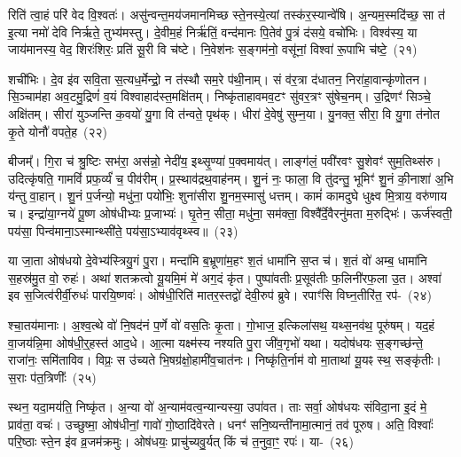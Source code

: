 रिति॑ त्वा॒हं परि॑ वेद वि॒श्वतः॑। असु॑न्वन्त॒मय॑जमानमिच्छ स्ते॒नस्ये॒त्यां तस्क॑र॒स्यान्वे॑षि। अ॒न्यम॒स्मदि॑च्छ॒ सा त॑ इ॒त्या नमो॑ देवि निर्\mbox{}ऋते॒ तुभ्य॑मस्तु। दे॒वीम॒हं निर्\mbox{}ऋ॑तिं॒ वन्द॑मानः पि॒तेव॑ पु॒त्रं द॑सये॒ वचो॑भिः। विश्व॑स्य॒ या जाय॑मानस्य॒ वेद॒ शिरः॑शिरः॒ प्रति॑ सू॒री वि च॑ष्टे। नि॒वेश॑नः स॒ङ्गम॑नो॒ वसू॑नां॒ विश्वा॑ रू॒पाभि च॑ष्टे॒~(२१)\ip

शची॑भिः। दे॒व इ॑व सवि॒ता स॒त्यध॒र्मेन्द्रो॒ न त॑स्थौ सम॒रे प॑थी॒नाम्। सं व॑र॒त्रा द॑धातन॒ निरा॑हा॒वान्कृ॑णोतन। सि॒ञ्चाम॑हा अव॒टमु॒द्रिणं॑ व॒यं विश्वाहाद॑स्त॒मक्षि॑तम्। निष्कृ॑ताहावमव॒टꣳ सु॑वर॒त्रꣳ सु॑षेच॒नम्। उ॒द्रिणꣳ॑ सिञ्चे॒ अक्षि॑तम्। सीरा॑ युञ्जन्ति क॒वयो॑ यु॒गा वि त॑न्वते॒ पृथ॑क्। धीरा॑ दे॒वेषु॑ सुम्न॒या। यु॒नक्त॒ सीरा॒ वि यु॒गा त॑नोत कृ॒ते योनौ॑ वपते॒ह~(२२)\ip

बीजम्᳚। गि॒रा च॑ श्रु॒ष्टिः सभ॑रा॒ अस॑न्नो॒ नेदी॑य॒ इथ्सृ॒ण्या॑ प॒क्वमाय॑त्। लाङ्ग॑लं॒ पवी॑रवꣳ सु॒शेवꣳ॑ सुम॒तिथ्स॑रु। उदित्कृ॑षति॒ गामविं॑ प्रफ॒र्व्यं॑ च॒ पीव॑रीम्। प्र॒स्थाव॑द्रथ॒वाह॑नम्। शु॒नं नः॒ फाला॒ वि तु॑दन्तु॒ भूमिꣳ॑ शु॒नं की॒नाशा॑ अ॒भि य॑न्तु वा॒हान्। शु॒नं प॒र्जन्यो॒ मधु॑ना॒ पयो॑भिः॒ शुना॑सीरा शु॒नम॒स्मासु॑ धत्तम्। कामं॑ कामदुघे धुक्ष्व मि॒त्राय॒ वरु॑णाय च। इन्द्रा॑या॒ग्नये॑ पू॒ष्ण ओष॑धीभ्यः प्र॒जाभ्यः॑। घृ॒तेन॒ सीता॒ मधु॑ना॒ सम॑क्ता॒ विश्वै᳚र्दे॒वैरनु॑मता म॒रुद्भिः॑। ऊर्ज॑स्वती॒ पय॑सा॒ पिन्व॑माना॒ऽस्मान्थ्सी॑ते॒ पय॑सा॒ऽभ्याव॑वृथ्स्व॥~(२३)\ip

{\anuvakamend[{समो॑कसौ विश्वरूपे वि॒दुर्निर्\mbox{}ऋ॑तिर॒भि च॑ष्ट इ॒ह मि॒त्राय॒ द्वाविꣳ॑शतिश्च}]}

या जा॒ता ओष॑धयो दे॒वेभ्य॑स्त्रियु॒गं पु॒रा। मन्दा॑मि ब॒भ्रूणा॑म॒हꣳ श॒तं धामा॑नि स॒प्त च॑। श॒तं वो॑ अम्ब॒ धामा॑नि स॒हस्र॑मु॒त वो॒ रुहः॑। अथा॑ शतक्रत्वो यू॒यमि॒मं मे॑ अग॒दं कृ॑त। पुष्पा॑वतीः प्र॒सूव॑तीः फ॒लिनी॑\-र\-फ॒ला उ॒त। अश्वा॑ इव स॒जित्व॑रीर्वी॒रुधः॑ पारयि॒ष्णवः॑। ओष॑धी॒\-रिति॑ मातर॒स्तद्वो॑ देवी॒रुप॑ ब्रुवे। रपाꣳ॑सि विघ्न॒तीरि॑त॒ रप॑-~(२४)\ip

श्चा॒तय॑मानाः। अ॒श्व॒त्थे वो॑ नि॒षद॑नं प॒र्णे वो॑ वस॒तिः कृ॒ता। गो॒भाज॒ इत्किला॑सथ॒ यथ्स॒नव॑थ॒ पूरु॑षम्। यद॒हं वा॒जय॑न्नि॒मा ओष॑धी॒र्॒\mbox{}हस्त॑ आद॒धे। आ॒त्मा यक्ष्म॑स्य नश्यति पु॒रा जी॑व॒गृभो॑ यथा। यदोष॑धयः स॒ङ्गच्छ॑न्ते॒ राजा॑नः॒ समि॑ताविव। विप्रः॒ स उ॑च्यते भि॒षग्र॑क्षो॒हामी॑व॒चात॑नः। निष्कृ॑ति॒र्नाम॑ वो मा॒ताथा॑ यू॒यꣴ स्थ॒ सङ्कृ॑तीः। स॒राः प॑त॒त्रिणीः᳚~(२५)\ip

स्थन॒ यदा॒मय॑ति॒ निष्कृ॑त। अ॒न्या वो॑ अ॒न्याम॑वत्व॒न्यान्यस्या॒ उपा॑वत। ताः सर्वा॒ ओष॑धयः संविदा॒ना इ॒दं मे॒ प्राव॑ता॒ वचः॑। उच्छुष्मा॒ ओष॑धीनां॒ गावो॑ गो॒ष्ठादि॑वेरते। धनꣳ॑ सनि॒ष्यन्ती॑नामा॒त्मानं॒ तव॑ पूरुष। अति॒ विश्वाः᳚ परि॒ष्ठाः स्ते॒न इ॑व व्र॒जम॑क्रमुः। ओष॑धयः॒ प्राचु॑च्यवु॒र्यत् किं च॑ त॒नुवा॒ꣳ॒ रपः॑। या-~(२६)\ip

